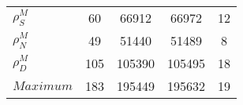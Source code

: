 \begin{center}
\begin{longtable}{lcccc}
$ {\rho^{M}_{S}}       $	 & 	                   60	 & 	                66912	 & 	                66972	 & 	                   12 \\ 
$ {\rho^{M}_{N}}       $	 & 	                   49	 & 	                51440	 & 	                51489	 & 	                    8 \\ 
$ {\rho^{M}_{D}}       $	 & 	                  105	 & 	               105390	 & 	               105495	 & 	                   18 \\ 
$Maximum               $	 & 	                  183	 & 	               195449	 & 	               195632	 & 	                   19 \\ 
\end{longtable}
 \end{center}

